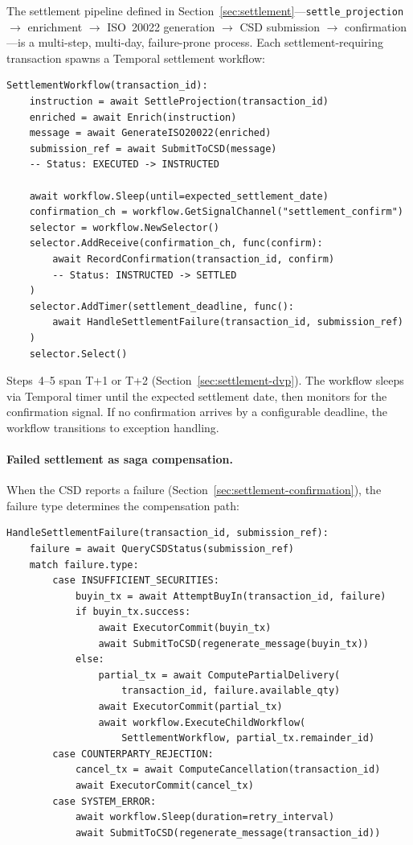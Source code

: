 \documentclass[11pt,a4paper]{article}
\begin{document}
The settlement pipeline defined in Section~\ref{sec:settlement}---\texttt{settle\_projection} $\to$ enrichment $\to$ ISO~20022 generation $\to$ CSD submission $\to$ confirmation---is a multi-step, multi-day, failure-prone process. Each settlement-requiring transaction spawns a Temporal settlement workflow:

\begin{lstlisting}
SettlementWorkflow(transaction_id):
    instruction = await SettleProjection(transaction_id)
    enriched = await Enrich(instruction)
    message = await GenerateISO20022(enriched)
    submission_ref = await SubmitToCSD(message)
    -- Status: EXECUTED -> INSTRUCTED

    await workflow.Sleep(until=expected_settlement_date)
    confirmation_ch = workflow.GetSignalChannel("settlement_confirm")
    selector = workflow.NewSelector()
    selector.AddReceive(confirmation_ch, func(confirm):
        await RecordConfirmation(transaction_id, confirm)
        -- Status: INSTRUCTED -> SETTLED
    )
    selector.AddTimer(settlement_deadline, func():
        await HandleSettlementFailure(transaction_id, submission_ref)
    )
    selector.Select()
\end{lstlisting}

\noindent Steps~4--5 span T+1 or T+2 (Section~\ref{sec:settlement-dvp}). The workflow sleeps via Temporal timer until the expected settlement date, then monitors for the confirmation signal. If no confirmation arrives by a configurable deadline, the workflow transitions to exception handling.

\paragraph{Failed settlement as saga compensation.} When the CSD reports a failure (Section~\ref{sec:settlement-confirmation}), the failure type determines the compensation path:

\begin{lstlisting}
HandleSettlementFailure(transaction_id, submission_ref):
    failure = await QueryCSDStatus(submission_ref)
    match failure.type:
        case INSUFFICIENT_SECURITIES:
            buyin_tx = await AttemptBuyIn(transaction_id, failure)
            if buyin_tx.success:
                await ExecutorCommit(buyin_tx)
                await SubmitToCSD(regenerate_message(buyin_tx))
            else:
                partial_tx = await ComputePartialDelivery(
                    transaction_id, failure.available_qty)
                await ExecutorCommit(partial_tx)
                await workflow.ExecuteChildWorkflow(
                    SettlementWorkflow, partial_tx.remainder_id)
        case COUNTERPARTY_REJECTION:
            cancel_tx = await ComputeCancellation(transaction_id)
            await ExecutorCommit(cancel_tx)
        case SYSTEM_ERROR:
            await workflow.Sleep(duration=retry_interval)
            await SubmitToCSD(regenerate_message(transaction_id))
\end{lstlisting}
\end{document}
